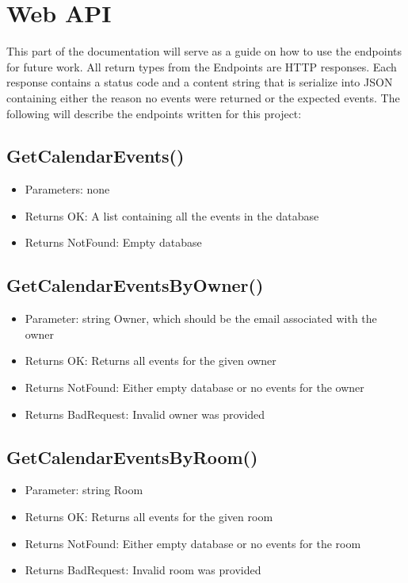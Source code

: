 \section{Web API}
This part of the documentation will serve as a guide on how to use the endpoints for future work. All return types from the Endpoints are HTTP responses. Each response contains a status code and a content string that is serialize into JSON containing either the reason no events were returned or the expected events. The following will describe the endpoints written for this project:

\subsection{GetCalendarEvents()}
\begin{itemize}
\item{Parameters}: none
\item{Returns OK}: A list containing all the events in the database
\item{Returns NotFound}: Empty database
\end{itemize}

\subsection{GetCalendarEventsByOwner()}
\begin{itemize}
\item{Parameter}: string Owner, which should be the email associated with the owner
\item{Returns OK}: Returns all events for the given owner
\item{Returns NotFound}: Either empty database or no events for the owner
\item{Returns BadRequest}: Invalid owner was provided
\end{itemize}

\subsection{GetCalendarEventsByRoom()}
\begin{itemize}
\item{Parameter}: string Room
\item{Returns OK}: Returns all events for the given room
\item{Returns NotFound}: Either empty database or no events for the room
\item{Returns BadRequest}: Invalid room was provided
\end{itemize}

